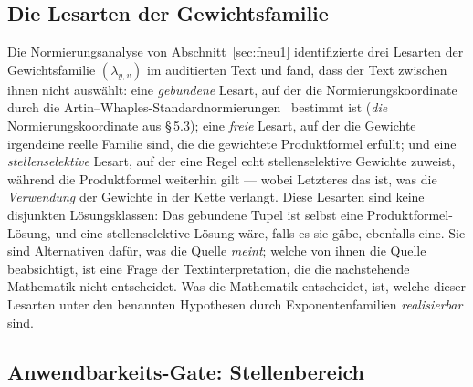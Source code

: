 \documentclass[11pt,a4paper]{article}
\theoremstyle{definition}
\theoremstyle{remark}
\begin{document}
\subsection{Die Lesarten der Gewichtsfamilie}

Die Normierungsanalyse von Abschnitt~\ref{sec:fneu1} identifizierte drei
Lesarten der Gewichtsfamilie $(\lambda_{y,v})$ im auditierten Text und fand,
dass der Text zwischen ihnen nicht auswählt: eine \emph{gebundene} Lesart,
auf der die Normierungskoordinate durch die
Artin--Whaples-Standardnormierungen~\cite{artinwhaples} bestimmt ist
(\glqq \emph{die} Normierungskoordinate\grqq{} aus \S\,5.3); eine \emph{freie} Lesart,
auf der die Gewichte irgendeine reelle Familie sind, die die gewichtete
Produktformel erfüllt; und eine \emph{stellenselektive} Lesart, auf der eine
Regel echt stellenselektive Gewichte zuweist, während die Produktformel
weiterhin gilt --- wobei Letzteres das ist, was die \emph{Verwendung} der
Gewichte in der Kette verlangt. Diese Lesarten sind keine disjunkten
Lösungsklassen: Das gebundene Tupel ist selbst eine Produktformel-Lösung,
und eine stellenselektive Lösung wäre, falls es sie gäbe, ebenfalls eine.
Sie sind Alternativen dafür, was die Quelle \emph{meint}; welche von ihnen
die Quelle beabsichtigt, ist eine Frage der Textinterpretation, die die
nachstehende Mathematik nicht entscheidet. Was die Mathematik entscheidet,
ist, welche dieser Lesarten unter den benannten Hypothesen durch
Exponentenfamilien \emph{realisierbar} sind.

\subsection{Anwendbarkeits-Gate: Stellenbereich}\label{sec:gate}
\end{document}
